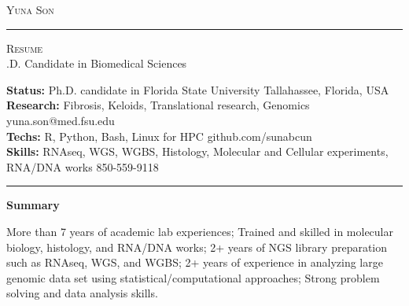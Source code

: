 \documentclass[10pt,A4]{article}
\newcommand{\cvsection}[1]
{
	\begin{center}
		\large\textcolor{sectcol}{\textbf{#1}}
	\end{center}
}
\newcommand{\metasection}[2]
{
\footnotesize{#2} \hspace*{\fill} \footnotesize{#1}\\[1pt]
}
\begin{document}
\pagestyle{fancy}	








\vspace{-8pt}
\begin{center}
	\HUGE \textsc{Yuna Son} \textcolor{sectcol}{\rule[-1mm]{1mm}{0.9cm}} \textsc{Resume}\\[2pt]
	\Ph.D. Candidate in Biomedical Sciences
\end{center}



\vspace{6pt}


\metasection{Tallahassee, Florida, USA}{\textbf{Status:} Ph.D. candidate in Florida State University}
\metasection{yuna.son@med.fsu.edu}{\textbf{Research:} Fibrosis, Keloids, Translational research, Genomics} 
\metasection{github.com/sunabcun}{\textbf{Techs:} R, Python, Bash, Linux for HPC}
\metasection{850-559-9118}{\textbf{Skills:} RNAseq, WGS, WGBS, Histology, Molecular and Cellular experiments, RNA/DNA works}
\vspace{-2pt}
\textcolor{softcol}{\hrule}
\vspace{6pt}

\normalsize

\vspace{-6pt}
\cvsection{Summary}
More than 7 years of academic lab experiences; Trained and skilled in molecular biology, histology, and RNA/DNA works; 
2+ years of NGS library preparation such as RNAseq, WGS, and WGBS; 2+ years of experience in analyzing large genomic data set using statistical/computational approaches;
Strong problem solving and data analysis skills.\\
\end{document}
